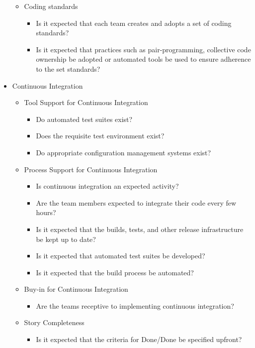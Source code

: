 \begin{appendices}
\begin{itemize}
\begin{itemize}
\begin{itemize}
				\end{itemize}
			\item Coding standards
				\begin{itemize}
					\item Is it expected that each team creates and adopts a set of coding standards?
					\item Is it expected that practices such as pair-programming, collective code ownership be adopted or automated tools be used to ensure adherence to the set standards?
				\end{itemize}
		\end{itemize}
	\item Continuous Integration
		\begin{itemize}
			\item Tool Support for Continuous Integration
				\begin{itemize}
					\item Do automated test suites exist?
					\item Does the requisite test environment exist?
					\item Do appropriate configuration management systems exist?
				\end{itemize}
			\item Process Support for Continuous Integration
				\begin{itemize}
					\item Is continuous integration an expected activity?
					\item Are the team members expected to integrate their code every few hours?
					\item Is it expected that the builds, tests, and other release infrastructure be kept up to date?
					\item Is it expected that automated test suites be developed?
					\item Is it expected that the build process be automated?
				\end{itemize}
			\item Buy-in for Continuous Integration
				\begin{itemize}
					\item Are the teams receptive to implementing continuous integration?
				\end{itemize}
			\item Story Completeness
				\begin{itemize}
					\item Is it expected that the criteria for Done/Done be specified upfront?

\end{itemize}
\end{itemize}
\end{itemize}
\end{appendices}
